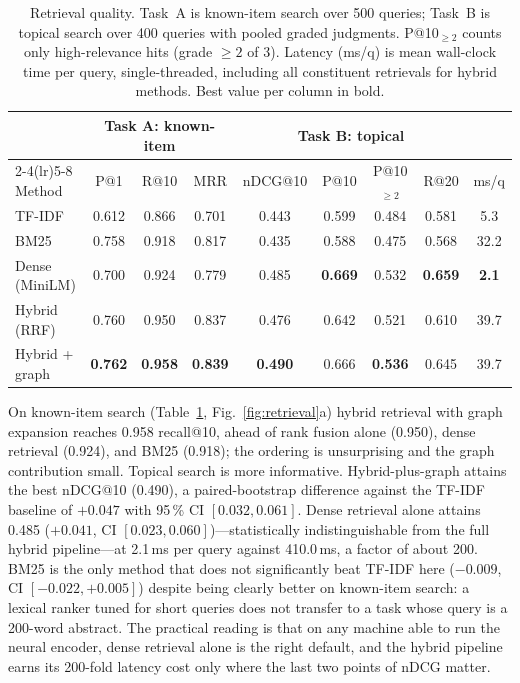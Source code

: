 \documentclass[runningheads]{llncs}
\begin{document}
\begin{table}[htbp]
\centering\small
\caption{Retrieval quality. Task~A is known-item search over 500 queries; Task~B is
topical search over 400 queries with pooled graded judgments. P@10$_{\ge 2}$ counts only
high-relevance hits (grade $\ge 2$ of 3). Latency (ms/q) is mean wall-clock time per
query, single-threaded, including all constituent retrievals for hybrid methods. Best
value per column in bold.}
\label{tab:retrieval}
\setlength{\tabcolsep}{3.0pt}
\begin{tabular}{lcccccccc}
\toprule
& \multicolumn{3}{c}{Task A: known-item} & \multicolumn{4}{c}{Task B: topical} & \\
\cmidrule(lr){2-4}\cmidrule(lr){5-8}
Method & P@1 & R@10 & MRR & nDCG@10 & P@10 & P@10$_{\ge 2}$ & R@20 & ms/q \\
\midrule
TF-IDF            & 0.612 & 0.866 & 0.701 & 0.443 & 0.599 & 0.484 & 0.581 & 5.3 \\
BM25              & 0.758 & 0.918 & 0.817 & 0.435 & 0.588 & 0.475 & 0.568 & 32.2 \\
Dense (MiniLM)    & 0.700 & 0.924 & 0.779 & 0.485 & \textbf{0.669} & 0.532 & \textbf{0.659} & \textbf{2.1} \\
Hybrid (RRF)      & 0.760 & 0.950 & 0.837 & 0.476 & 0.642 & 0.521 & 0.610 & 39.7 \\
Hybrid + graph    & \textbf{0.762} & \textbf{0.958} & \textbf{0.839} & \textbf{0.490} & 0.666 & \textbf{0.536} & 0.645 & 39.7 \\
\bottomrule
\end{tabular}
\end{table}

On known-item search (Table~\ref{tab:retrieval}, Fig.~\ref{fig:retrieval}a) hybrid
retrieval with graph expansion reaches 0.958 recall@10, ahead of rank fusion alone
(0.950), dense retrieval (0.924), and BM25 (0.918); the ordering is unsurprising and the
graph contribution small. Topical search is more informative. Hybrid-plus-graph attains the best nDCG@10
(0.490), a paired-bootstrap difference against the TF-IDF baseline of $+0.047$ with
95\,\% CI $[0.032, 0.061]$. Dense retrieval alone attains 0.485 ($+0.041$, CI
$[0.023, 0.060]$)---statistically indistinguishable from the full hybrid
pipeline---at 2.1\,ms per query against 410.0\,ms, a factor of about 200. BM25 is the
only method that does not significantly beat TF-IDF here ($-0.009$, CI
$[-0.022, +0.005]$) despite being clearly better on known-item search: a lexical
ranker tuned for short queries does not transfer to a task whose query is a 200-word
abstract. The practical reading is that on any machine able to run the neural encoder,
dense retrieval alone is the right default, and the hybrid pipeline earns its
200-fold latency cost only where the last two points of nDCG matter.
\end{document}
